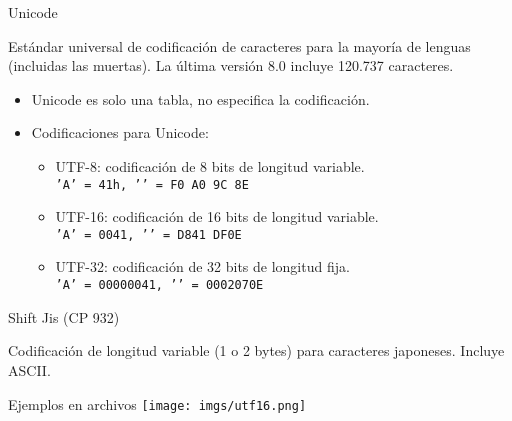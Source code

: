 \begin{frame}{Unicode}
    \begin{block}{}
        Estándar universal de codificación de caracteres para la mayoría de lenguas (incluidas las muertas). La última versión 8.0 incluye 120.737 caracteres.
    \end{block}

    \begin{itemize}
        \item<2-> Unicode es solo una tabla, no especifica la codificación.
        \item<3-> Codificaciones para Unicode:
        \begin{itemize}
            \item<4-> UTF-8: codificación de 8 bits de longitud variable.\\ \texttt{'A' = 41h, '}\texttt{' = F0 A0 9C 8E}
            \item<5-> UTF-16: codificación de 16 bits de longitud variable. \\ \texttt{'A' = 0041, '}\texttt{' = D841 DF0E}
            \item<6-> UTF-32: codificación de 32 bits de longitud fija. \\ \texttt{'A' = 00000041, '}\texttt{' = 0002070E}
        \end{itemize}
    \end{itemize}
\end{frame}

\begin{frame}{Shift Jis (CP 932)}
    \begin{block}{}
        Codificación de longitud variable (1 o 2 bytes) para caracteres japoneses. Incluye ASCII.
    \end{block}
\end{frame}

\begin{frame}{Ejemplos en archivos}
    \centering\Large
    \texttt{[image: imgs/utf16.png]} \\
\end{frame}

